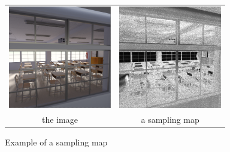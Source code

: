 \documentclass{classeENS}
\begin{document}
\begin{figure}[H]
    \centering
    \caption{Example of a sampling map}
    \begin{tabular}{cc}
    \includegraphics[width=45mm]{image/without/gt.png}
    & \includegraphics[width=45mm]{image/without/sm.png}\\
    the image & a sampling map
    \end{tabular}
\end{figure}
\end{document}
